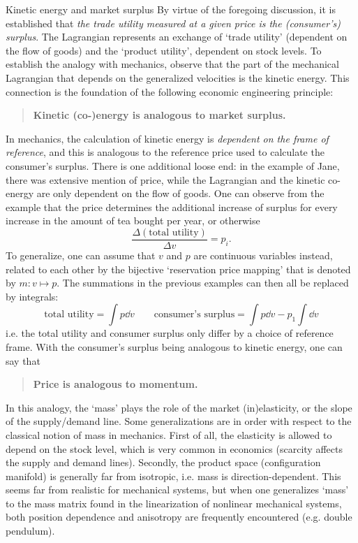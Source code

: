 \begin{econ}{Kinetic energy and market surplus}
   By virtue of the foregoing discussion, it is established that \emph{the trade utility measured at a given price is the (consumer's) surplus}. The Lagrangian represents an exchange of `trade utility' (dependent on the flow of goods) and the `product utility', dependent on stock levels. To establish the analogy with mechanics, observe that the part of the mechanical Lagrangian that depends on the generalized velocities is the kinetic energy. This connection is the foundation of the following economic engineering principle:
    \begin{quote}
        \textbf{Kinetic (co-)energy is analogous to market surplus.}
    \end{quote}
    In mechanics, the calculation of kinetic energy is \emph{dependent on the frame of reference}, and this is analogous to the reference price used to calculate the consumer's surplus. There is one additional loose end: in the example of Jane, there was extensive mention of price, while the Lagrangian and the kinetic co-energy are only dependent on the flow of goods. One can observe from the example that the price determines the additional increase of surplus for every increase in the amount of tea bought per year, or otherwise
    $$
        \frac{\Delta (\text{total utility})}{\Delta v} = p_i.
    $$
    To generalize, one can assume that $v$ and $p$ are continuous variables instead, related to each other by the bijective `reservation price mapping' that is denoted by $m: v \mapsto p$. The summations in the previous examples can then all be replaced by integrals:
    $$ 
        \text{total utility} = \int p\dd{v} \qquad 
        \text{consumer's surplus} = \int p\dd{v} - p_1\int \dd{v}
    $$ 
    i.e. the total utility and consumer surplus only differ by a choice of reference frame. With the consumer's surplus being analogous to kinetic energy, one can say that
    \begin{quote}
        \textbf{Price is analogous to momentum.}
    \end{quote}
    In this analogy, the `mass' plays the role of the market (in)elasticity, or the slope of the supply/demand line. Some generalizations are in order with respect to the classical notion of mass in mechanics. First of all, the elasticity is allowed to depend on the stock level, which is very common in economics (scarcity affects the supply and demand lines). Secondly, the product space (configuration manifold) is generally far from isotropic, i.e. mass is direction-dependent. This seems far from realistic for mechanical systems, but when one generalizes `mass' to the mass matrix found in the linearization of nonlinear mechanical systems, both position dependence and anisotropy are frequently encountered (e.g. double pendulum).
\end{econ}

